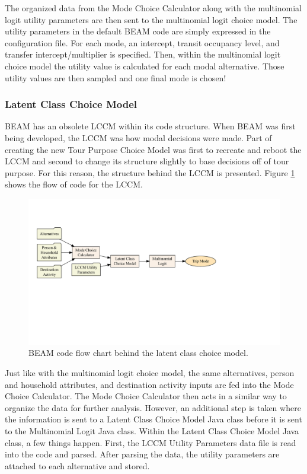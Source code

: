 \documentclass[12pt, oneside, openright]{byuthesis}
\begin{document}
The organized data from the Mode Choice Calculator along with the multinomial logit utility parameters are then sent to the multinomial logit choice model. The utility parameters in the default BEAM code are simply expressed in the configuration file. For each mode, an intercept, transit occupancy level, and transfer intercept/multiplier is specified. Then, within the multinomial logit choice model the utility value is calculated for each modal alternative. Those utility values are then sampled and one final mode is chosen!

\hypertarget{latent-class-choice-model}{%
\subsubsection{Latent Class Choice Model}\label{latent-class-choice-model}}

BEAM has an obsolete LCCM within its code structure. When BEAM was first being developed, the LCCM was how modal decisions were made. Part of creating the new Tour Purpose Choice Model was first to recreate and reboot the LCCM and second to change its structure slightly to base decisions off of tour purpose. For this reason, the structure behind the LCCM is presented. Figure \ref{fig:lccmflow} shows the flow of code for the LCCM.

\begin{figure}

{\centering \includegraphics{thesis_files/figure-latex/lccmflow-1} 

}

\caption{BEAM code flow chart behind the latent class choice model.}\label{fig:lccmflow}
\end{figure}

Just like with the multinomial logit choice model, the same alternatives, person and household attributes, and destination activity inputs are fed into the Mode Choice Calculator. The Mode Choice Calculator then acts in a similar way to organize the data for further analysis. However, an additional step is taken where the information is sent to a Latent Class Choice Model Java class before it is sent to the Multinomial Logit Java class. Within the Latent Class Choice Model Java class, a few things happen. First, the LCCM Utility Parameters data file is read into the code and parsed. After parsing the data, the utility parameters are attached to each alternative and stored.
\end{document}
